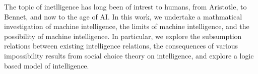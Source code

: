  
 
The topic of inetlligence has long been of intrest to humans, from Aristotle, to Bennet, and now to the age of AI. In this work, we undertake a mathmatical investigation of machine intelligence, the limits of machine intelligence, and the possibility of machine intelligence. In particular, we explore the subsumption relations between existing intelligence relations, the consequences of various impossibility results from social choice theory on intelligence, and explore a logic based model of intelligence.